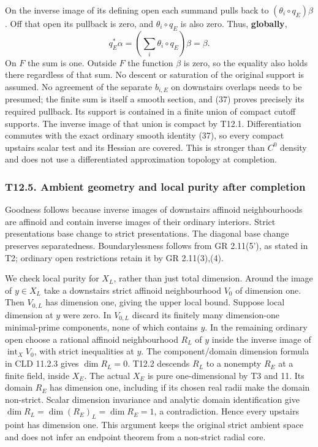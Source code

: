 \documentclass[
  10pt,
]{article}
\begin{document}
On the inverse image of its defining open each summand pulls back to
\((\theta_i\circ q_E)\beta\). Off that open its pullback is zero, and
\(\theta_i\circ q_E\) is also zero. Thus, \textbf{globally}, \[
 q_E^*\alpha=(\sum_i\theta_i\circ q_E)\beta=\beta.       \tag{37}
\] On \(F\) the sum is one. Outside \(F\) the function \(\beta\) is
zero, so the equality also holds there regardless of that sum. No
descent or saturation of the original support is assumed. No agreement
of the separate \(b_{i,E}\) on downstairs overlaps needs to be presumed;
the finite sum is itself a smooth section, and (37) proves precisely its
required pullback. Its support is contained in a finite union of compact
cutoff supports. The inverse image of that union is compact by T12.1.
Differentiation commutes with the exact ordinary smooth identity (37),
so every compact upstairs scalar test and its Hessian are covered. This
is stronger than \(C^0\) density and does not use a differentiated
approximation topology at completion.

\subsubsection{T12.5. Ambient geometry and local purity after
completion}\label{t12.5.-ambient-geometry-and-local-purity-after-completion}

Goodness follows because inverse images of downstairs affinoid
neighbourhoods are affinoid and contain inverse images of their ordinary
interiors. Strict presentations base change to strict presentations. The
diagonal base change preserves separatedness. Boundarylessness follows
from GR 2.11(5'), as stated in T2; ordinary open restrictions retain it
by GR 2.11(3),(4).

We check local purity for \(X_L\), rather than just total dimension.
Around the image of \(y\in X_L\) take a downstairs strict affinoid
neighbourhood \(V_0\) of dimension one. Then \(V_{0,L}\) has dimension
one, giving the upper local bound. Suppose local dimension at \(y\) were
zero. In \(V_{0,L}\) discard its finitely many dimension-one
minimal-prime components, none of which contains \(y\). In the remaining
ordinary open choose a rational affinoid neighbourhood \(R_L\) of \(y\)
inside the inverse image of \(\operatorname{int}_X V_0\), with strict
inequalities at \(y\). The component/domain dimension formula in CLD
11.2.3 gives \(\dim R_L=0\). T12.2 descends \(R_L\) to a nonempty
\(R_E\) at a finite field, inside \(X_E\). The actual \(X_E\) is pure
one-dimensional by T3 and 11. Its domain \(R_E\) has dimension one,
including if its chosen real radii make the domain non-strict. Scalar
dimension invariance and analytic domain identification give
\(\dim R_L=\dim(R_E)_L=\dim R_E=1\), a contradiction. Hence every
upstairs point has dimension one. This argument keeps the original
strict ambient space and does not infer an endpoint theorem from a
non-strict radial core.
\end{document}
